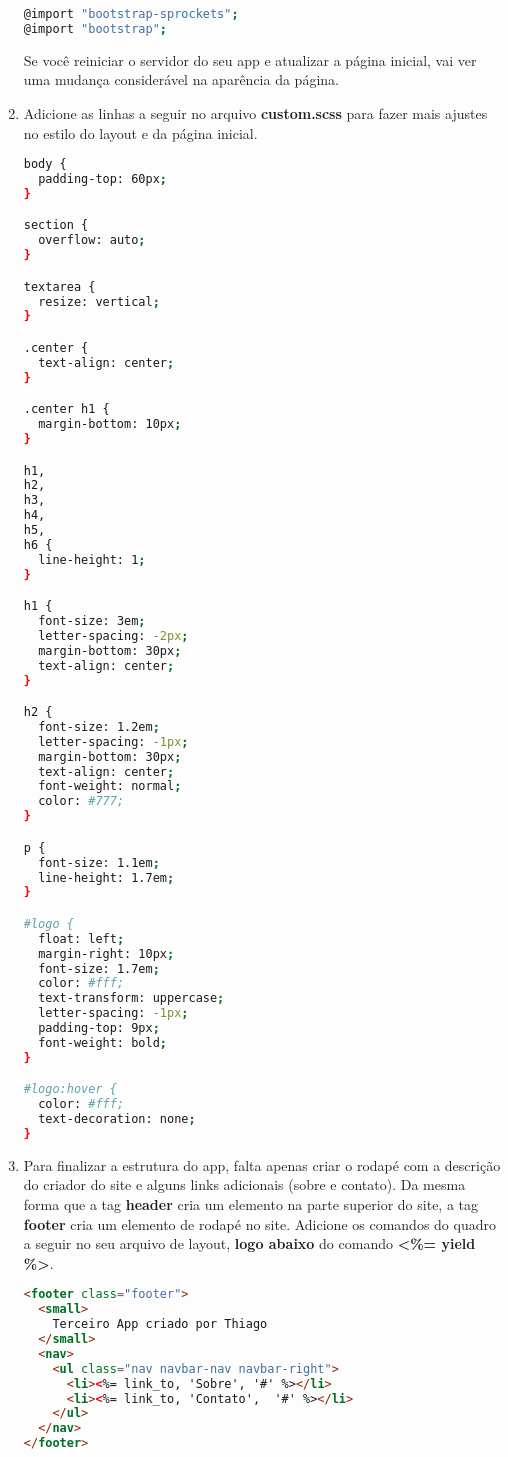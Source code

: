 \documentclass[a4paper,12pt]{article}
\begin{document}
\begin{enumerate}
  \begin{lstlisting}[language=Bash, title={app/assets/stylesheets/custom.scss}]
@import "bootstrap-sprockets";
@import "bootstrap";
  \end{lstlisting}

  Se você reiniciar o servidor do seu app e atualizar a página inicial, vai ver uma mudança considerável na aparência da página.

  \item Adicione as linhas a seguir no arquivo \textbf{custom.scss} para fazer mais ajustes no estilo do layout e da página inicial.

  \begin{lstlisting}[language=Bash, title={app/assets/stylesheets/custom.scss}]
body {
  padding-top: 60px;
}

section {
  overflow: auto;
}

textarea {
  resize: vertical;
}

.center {
  text-align: center;
}

.center h1 {
  margin-bottom: 10px;
}

h1,
h2,
h3,
h4,
h5,
h6 {
  line-height: 1;
}

h1 {
  font-size: 3em;
  letter-spacing: -2px;
  margin-bottom: 30px;
  text-align: center;
}

h2 {
  font-size: 1.2em;
  letter-spacing: -1px;
  margin-bottom: 30px;
  text-align: center;
  font-weight: normal;
  color: #777;
}

p {
  font-size: 1.1em;
  line-height: 1.7em;
}

#logo {
  float: left;
  margin-right: 10px;
  font-size: 1.7em;
  color: #fff;
  text-transform: uppercase;
  letter-spacing: -1px;
  padding-top: 9px;
  font-weight: bold;
}

#logo:hover {
  color: #fff;
  text-decoration: none;
}
  \end{lstlisting}

  \item Para finalizar a estrutura do app, falta apenas criar o rodapé com a descrição do criador do site e alguns links adicionais (sobre e contato). Da mesma forma que a tag \textbf{header} cria um elemento na parte superior do site, a tag \textbf{footer} cria um elemento de rodapé no site. Adicione os comandos do quadro a seguir no seu arquivo de layout, \textbf{logo abaixo} do comando \textbf{<\%= yield \%>}.

  \pagebreak

  \begin{lstlisting}[language=html, title={app/views/layouts/application.html.erb}, basicstyle=\scriptsize]
<footer class="footer">
  <small>
    Terceiro App criado por Thiago
  </small>
  <nav>
    <ul class="nav navbar-nav navbar-right">
      <li><%= link_to, 'Sobre', '#' %></li>
      <li><%= link_to, 'Contato',  '#' %></li>
    </ul>
  </nav>
</footer>
  \end{lstlisting}


\end{enumerate}
\end{document}
